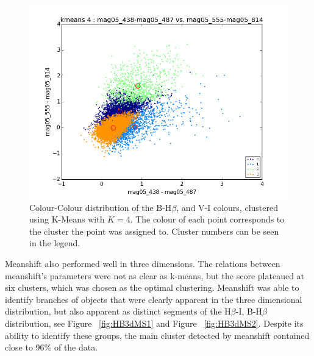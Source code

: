 \begin{figure}
\centering
\includegraphics[width=\linewidth]{figs/kmeans_base_color_4cl_mag05_438-mag05_487vsmag05_555-mag05_814}
\caption{Colour-Colour distribution of the B-H$\beta$, and V-I colours, clustered using K-Means with $K=4$. The colour of each point corresponds to the cluster the point was assigned to. Cluster numbers can be seen in the legend.}
\label{fig:HBKM3d}
\end{figure}

Meanshift also performed well in three dimensions.
The relations between meanshift's parameters were not as clear as k-means, but the score plateaued at six clusters, which was chosen as the optimal clustering.
Meanshift was able to identify branches of objects that were clearly apparent in the three dimensional distribution, but also apparent as distinct segments of the H$\beta$-I, B-H$\beta$ distribution, see Figure ~\ref{fig:HB3dMS1} and Figure ~\ref{fig:HB3dMS2}.
Despite its ability to identify these groups, the main cluster detected by meanshift contained close to 96\% of the data.

